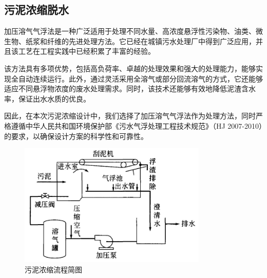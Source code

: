 \subsection{污泥浓缩脱水}
加压溶气气浮法是一种广泛适用于处理不同水量、高浓度悬浮性污染物、油类、微生物、纸浆和纤维的先进处理方法。它已经在城镇污水处理厂中得到广泛应用，并且该工艺在工程实践中已经积累了丰富的经验。

该方法具有多项优势，包括高负荷率、卓越的处理效果和强大的处理能力，能够实现全自动连续运行。此外，通过灵活采用全溶气或部分回流溶气的方式，它还能够适应不同悬浮物浓度的废水处理需求。同时，该技术还能够有效地降低泥渣含水率，保证出水水质的优良。\cite{HJ2007-2010}

因此，在本次污泥浓缩设计中，我们选择了加压溶气气浮法作为处理方法，同时严格遵循中华人民共和国环境保护部《污水气浮处理工程技术规范》（HJ 2007-2010）的要求，以确保设计方案的科学性和可靠性。

\begin{figure}[H]
	\centering
	\includegraphics[width=0.8\textwidth]{figures/Sludge thickening process diagram.png}
	\caption{污泥浓缩流程简图}
	\label{fig:Sludge thickening process diagram}
\end{figure}


